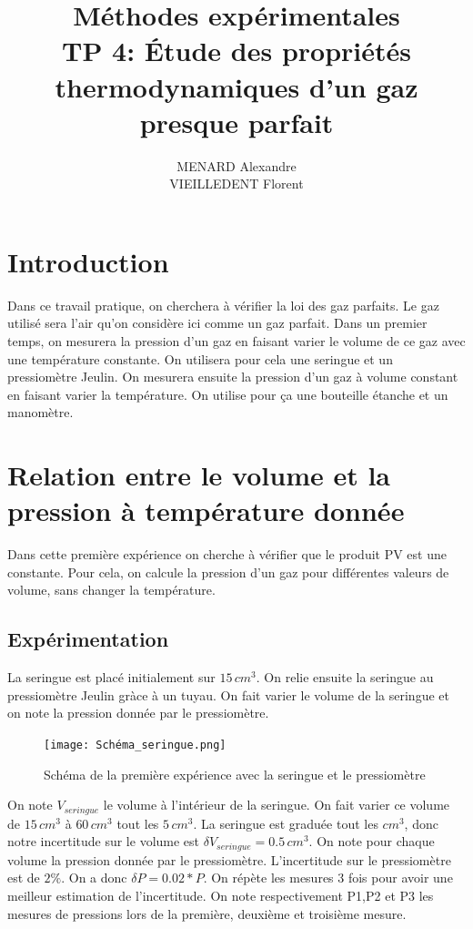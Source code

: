 \documentclass[12pt]{article}
\title{\textbf{Méthodes expérimentales} \\ TP 4: Étude des propriétés thermodynamiques d'un gaz presque parfait}
\author{MENARD Alexandre \\ VIEILLEDENT Florent}
\begin{document}
\maketitle

\section*{Introduction}
Dans ce travail pratique, on cherchera à vérifier la loi des gaz parfaits. Le gaz utilisé sera l'air qu'on considère ici comme un gaz parfait. Dans un premier temps, on mesurera la pression d'un gaz en faisant varier le volume de ce gaz avec une température constante. On utilisera pour cela une seringue et un pressiomètre Jeulin. 
On mesurera ensuite la pression d'un gaz à volume constant en faisant varier la température. On utilise pour ça une bouteille étanche et un manomètre.

\newpage
\section{Relation entre le volume et la pression à température donnée}

Dans cette première expérience on cherche à vérifier que le produit PV est une constante. Pour cela, on calcule la pression d'un gaz pour différentes valeurs de volume, sans changer la température. 	

\subsection{Expérimentation}

La seringue est placé initialement sur $15\, cm^3$. On relie ensuite la seringue au pressiomètre Jeulin gràce à un tuyau. On fait varier le volume de la seringue et on note la pression donnée par le pressiomètre. 

\begin{figure}[!h]
	\begin{center}
		\texttt{[image: Schéma\_seringue.png]}
		\label{Schéma_seringue}
		\caption{Schéma de la première expérience avec la seringue et le pressiomètre}
	\end{center}
\end{figure}




On note $V_{seringue}$ le volume à l'intérieur de la seringue. On fait varier ce volume de $15\, cm^3$ à $60\, cm^3$ tout les $5\, cm^3$. La seringue est graduée tout les $cm^3$, donc notre incertitude sur le volume est $\delta V_{seringue}=0.5 \, cm^3$.  On note pour chaque volume la pression donnée par le pressiomètre. L'incertitude sur le pressiomètre est de $2\% $. On a donc $\delta P = 0.02*P$. On répète les mesures 3 fois pour avoir une meilleur estimation de l'incertitude. On note respectivement P1,P2 et P3 les mesures de pressions lors de la première, deuxième et troisième mesure. 
\end{document}
